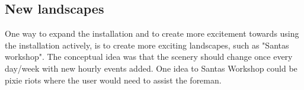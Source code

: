 \subsection{New landscapes}
One way to expand the installation and to create more excitement towards using the installation actively, is to create more exciting landscapes, such as "Santas workshop". The conceptual idea was that the scenery should change once every day/week with new hourly events added. One idea to Santas Workshop could be pixie riots where the user would need to assist the foreman.

